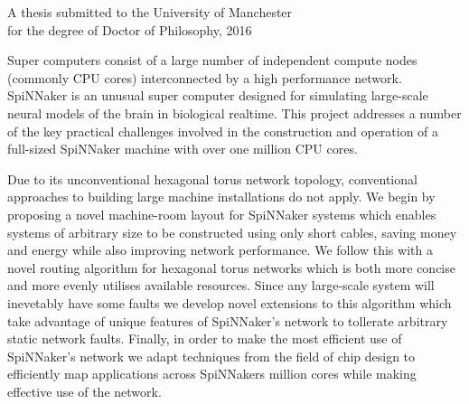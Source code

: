 {
	
	
	
	\vfill
	
	\begin{center}
		\textsc{\large\thesistitle}
		
		\vspace{1em}
		
		\thesisauthor
		
		\vspace{1em}
		
		A thesis submitted to the University of Manchester\\
		for the degree of Doctor of Philosophy, 2016
	\end{center}
	
	\vfill
	
	Super computers consist of a large number of independent compute nodes
	(commonly CPU cores) interconnected by a high performance network. SpiNNaker is
	an unusual super computer designed for simulating large-scale neural models of
	the brain in biological realtime. This project addresses a number of the key
	practical challenges involved in the construction and operation of a full-sized
	SpiNNaker machine with over one million CPU cores.
	
	Due to its unconventional hexagonal torus network topology, conventional
	approaches to building large machine installations do not apply. We begin by
	proposing a novel machine-room layout for SpiNNaker systems which enables
	systems of arbitrary size to be constructed using only short cables, saving
	money and energy while also improving network performance. We follow this with
	a novel routing algorithm for hexagonal torus networks which is both more
	concise and more evenly utilises available resources. Since any large-scale
	system will inevetably have some faults we develop novel extensions to this
	algorithm which take advantage of unique features of SpiNNaker's network to
	tollerate arbitrary static network faults. Finally, in order to make the most
	efficient use of SpiNNaker's network we adapt techniques from the field of chip
	design to efficiently map applications across SpiNNakers million cores while
	making effective use of the network.

	\par%
}
